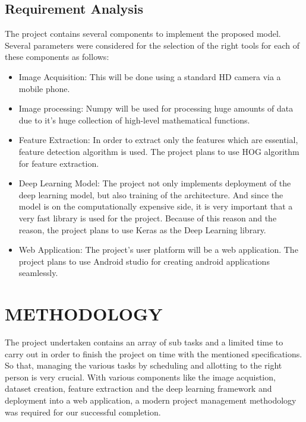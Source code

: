 \documentclass[a4paper,12pt]{report}
\begin{document}
\section{Requirement Analysis}
The project contains several components to implement the proposed model. Several parameters were considered for the selection of the right tools for each of these components as follows:

\begin{itemize}
\item Image Acquisition: This will be done using a standard HD camera via a mobile phone.
\item Image processing: Numpy will be used for processing huge amounts of data due to it’s huge collection of high-level mathematical functions.
\item Feature Extraction: In order to extract only the features which are essential, feature detection algorithm is used. The project plans to use HOG algorithm for feature extraction.
\item Deep Learning Model: The project not only implements deployment of the deep learning model, but also training of the architecture. And since the model is on the computationally expensive side, it is very important that a very fast library is used for the project. Because of this reason and the reason, the project plans to use Keras as the Deep Learning library. 
\item Web Application: The project’s user platform will be a web application. The project plans to use Android studio for creating android applications seamlessly.
\end{itemize} 


\newpage
\renewcommand\chaptername{CHAPTER}
\chapter{METHODOLOGY}
The project undertaken contains an array of sub tasks and a limited 
time to carry out in order to finish the project on time with the 
mentioned specifications. So that, managing the various tasks by 
scheduling and allotting to the right person is very crucial. With 
various components like the image acquistion, dataset creation, feature 
extraction and the deep learning framework and deployment into a web 
application, a modern project management methodology was required for 
our successful completion.
\end{document}
